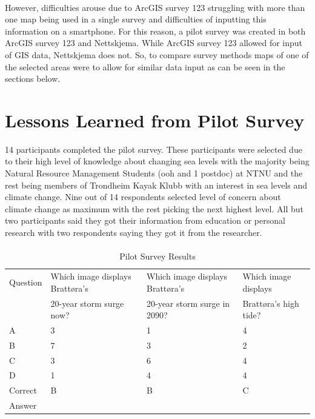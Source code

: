 \paragraph{}
However, difficulties arouse due to ArcGIS survey 123 struggling with more than one map being used in a single survey and difficulties of inputting this information on a smartphone. For this reason, a pilot survey was created in both ArcGIS survey 123 and Nettskjema. While ArcGIS survey 123 allowed for input of GIS data, Nettskjema does not. So, to compare survey methods maps of one of the selected areas were to allow for similar data input as can be seen in the sections below. 

\section{Lessons Learned from Pilot Survey}
14 participants completed the pilot survey. These participants were selected due to their high level of knowledge about changing sea levels with the majority being Natural Resource Management Students (ooh and 1 postdoc) at NTNU and the rest being members of Trondheim Kayak Klubb with an interest in sea levels and climate change. Nine out of 14 respondents selected level of concern about climate change as maximum with the rest picking the next highest level. All but two participants said they got their information from education or personal research with two respondents saying they got it from the researcher. 
\paragraph{}
\begin{table}[h]
    \centering
    \begin{tabular}{|l|l|l|l|}
    \hline
        Question & Which image displays Brattøra's  & Which image displays Brattøra's & Which image displays   \\ \newline
         & 20-year storm surge now? &  20-year storm surge in 2090? & Brattøra's high tide? \\ \hline
        A & 3 & 1 & 4 \\ \hline
        B & 7 & 3 & 2 \\ \hline
        C & 3 & 6 & 4 \\ \hline
        D & 1 & 4 & 4 \\ \hline
        Correct & B & B & C \\ \newline
        Answer &  &  &  \\ \hline
    \end{tabular}
    \caption{Pilot Survey Results}
    \label{table: pilot-survey}
\end{table}

